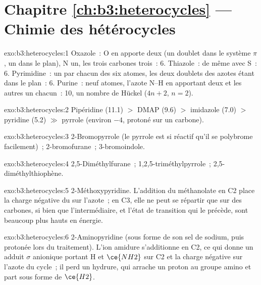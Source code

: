 \section*{Chapitre \ref{ch:b3:heterocycles} --- Chimie des hétérocycles}

\begin{solution}{exo:b3:heterocycles:1}
Oxazole~: O en apporte deux (un doublet dans le système $\pi$, un dans le plan), N un, les
trois carbones trois~: 6. Thiazole~: de même avec S~: 6. Pyrimidine~: un
par chacun des six atomes, les deux doublets des azotes étant dans le
plan~: 6. Purine~: neuf atomes, l'azote N--H en apportant deux et les
autres un chacun~: 10, un nombre de Hückel
($4n + 2$, $n = 2$).
\end{solution}

\begin{solution}{exo:b3:heterocycles:2}
Pipéridine (11.1) $>$ DMAP (9.6) $>$ imidazole (7.0) $>$ pyridine (5.2) $\gg$ pyrrole (environ $-4$,
protoné sur un carbone).
\end{solution}

\begin{solution}{exo:b3:heterocycles:3}
2-Bromopyrrole (le pyrrole est si réactif qu'il se polybrome facilement)~;
2-bromofurane~; 3-bromoindole.
\end{solution}

\begin{solution}{exo:b3:heterocycles:4}
2,5-Diméthylfurane~; 1,2,5-triméthylpyrrole~; 2,5-diméthylthiophène.
\end{solution}

\begin{solution}{exo:b3:heterocycles:5}
2-Méthoxypyridine. L'addition du méthanolate en C2 place la charge
négative du  sur l'azote~; en C3, elle ne peut se
répartir que sur des carbones, si bien que l'intermédiaire, et l'état de
transition qui le précède, sont beaucoup plus hauts en énergie.
\end{solution}

\begin{solution}{exo:b3:heterocycles:6}
2-Aminopyridine (sous forme de son sel de sodium, puis protonée lors du
traitement). L'ion amidure s'additionne en C2, ce qui donne un adduit $\sigma$ anionique portant H et $\ce{NH2}$ sur C2 et la charge
négative sur l'azote du cycle~; il perd un hydrure, qui arrache un proton
au groupe amino et part sous forme de $\ce{H2}$.
\end{solution}

